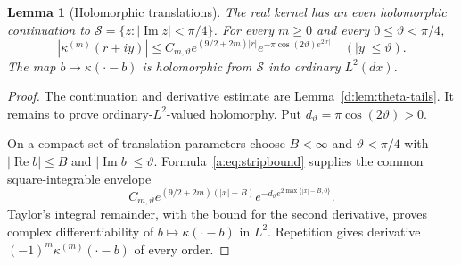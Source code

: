 \documentclass[11pt,a4paper]{article}
\numberwithin{equation}{section}
\newtheorem{lemma}[theorem]{Lemma}
\theoremstyle{definition}\newtheorem{definition}[theorem]{Definition}
\theoremstyle{remark}\newtheorem{remark}[theorem]{Remark}
\begin{document}
\begin{lemma}[Holomorphic translations]\label{a:lem:strip}
The real kernel has an even holomorphic continuation to
$\mathcal S=\{z:|\operatorname{Im}z|<\pi/4\}$. For every $m\ge0$ and every $0\le\vartheta<\pi/4$,
\begin{equation}\label{a:eq:stripbound}
 |\kappa^{(m)}(r+iy)|\le C_{m,\vartheta}
 e^{(9/2+2m)|r|}
 e^{-\pi\cos(2\vartheta)e^{2|r|}}
 \quad(|y|\le\vartheta).
\end{equation}
The map $b\mapsto\kappa(\cdot-b)$ is holomorphic from $\mathcal S$ into ordinary $L^2(dx)$.
\end{lemma}
\begin{proof}
The continuation and derivative estimate are Lemma~\ref{d:lem:theta-tails}. It remains to prove ordinary-$L^2$-valued holomorphy. Put $d_\vartheta=\pi\cos(2\vartheta)>0$.

On a compact set of translation parameters choose $B<\infty$ and $\vartheta<\pi/4$ with $|\operatorname{Re}b|\le B$ and $|\operatorname{Im}b|\le\vartheta$. Formula~\eqref{a:eq:stripbound} supplies the common square-integrable envelope
\[
 C_{m,\vartheta}e^{(9/2+2m)(|x|+B)}
       e^{-d_\vartheta e^{2\max\{|x|-B,0\}}}.
\]
Taylor's integral remainder, with the bound for the second derivative, proves complex differentiability of $b\mapsto\kappa(\cdot-b)$ in $L^2$. Repetition gives derivative $(-1)^m\kappa^{(m)}(\cdot-b)$ of every order.
\end{proof}
\end{document}

